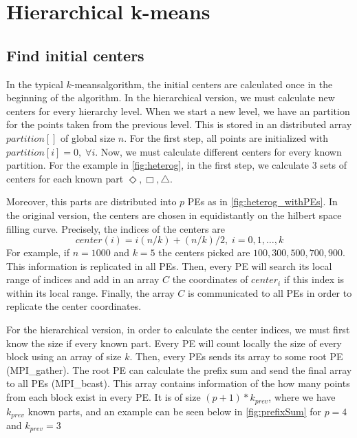 \documentclass[a4paper,10pt]{article}
\author{Harry Tzovas}
\newcommand{\km}{$k$-means}
\begin{document}
\section*{Hierarchical k-means}

\subsection*{Find initial centers}
In the typical \km algorithm, the initial centers are calculated once in the beginning of the algorithm.
In the hierarchical version, we must calculate new centers for every hierarchy level. 
When we start a new level, we have an partition for the points taken from the previous level. 
This is stored in an distributed array $partition[]$ of global size $n$. For the first step,
all points are initialized with $partition[i]=0,\;\forall i$. 
Now, we must calculate different centers for every known partition. For the example in \cref{fig:heterog},
in the first step, we calculate 3 sets of centers for each known part $\Diamond, \Box, \bigtriangleup$.

Moreover, this parts are distributed into $p$ PEs as in \cref{fig:heterog_withPEs}. In the original
version, the centers are chosen in equidistantly on the hilbert space filling curve. Precisely,
the indices of the centers are 
$$
center(i) = i(n/k)+(n/k)/2,\; i=0,1,\dots, k
$$
For example, if $n=1000$ and $k=5$ the centers picked are $100,300,500,700,900$. This information is
replicated in all PEs. Then, every PE will search its local range of indices and add in an array $C$
the coordinates of $center_i$ if this index is within its local range. Finally, the array $C$ is 
communicated to all PEs in order to replicate the center coordinates.

For the hierarchical version, in order to calculate the center indices, we must first know the size
if every known part. Every PE will count locally the size of every block using an array of size $k$.
Then, every PEs sends its array to some root PE (MPI\_gather). The root PE can calculate the prefix sum 
and send the final array to all PEs (MPI\_bcast). This array contains information of the how many 
points from each block exist in every PE. It is of size $(p+1)*k_{prev}$, where we have $k_{prev}$ 
known parts, and an example can be seen below in \cref{fig:prefixSum} for $p=4$ and $k_{prev}=3$
\end{document}
